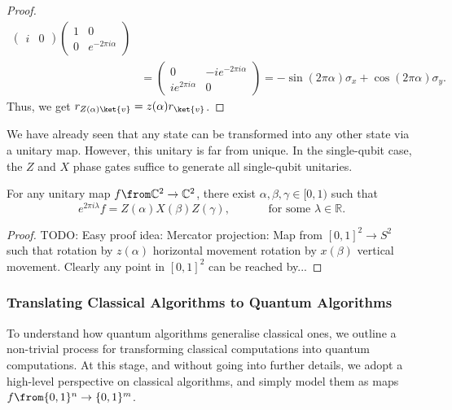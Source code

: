 \documentclass[a4paper,oneside, 12pt]{amsart}
\begin{document}
\begin{proof}
\begin{align*}
\begin{pmatrix}
        i & 0
      \end{pmatrix}
      \begin{pmatrix}
        1 & 0 \\
        0 & e^{-2\pi i \alpha}
      \end{pmatrix}\\
    & =
      \begin{pmatrix}
        0 & -ie^{-2\pi i \alpha} \\
        ie^{2\pi i \alpha} & 0
      \end{pmatrix}
      = -\sin(2\pi \alpha) \sigma_x + \cos(2\pi \alpha) \sigma_y.
  \end{align*}
  Thus, we get \(r_{Z(\alpha) \ket{v}} = z(\alpha)r_{\ket{v}}\).
\end{proof}

We have already seen that any state can be transformed into any other state via a unitary map.
However, this unitary is far from unique.
In the single-qubit case, the \( Z \) and \( X \) phase gates suffice to generate all single-qubit unitaries.

\begin{lemma}\label{lem:euler-decomposition-of-rotation}
  For any unitary map \( f \from \mathbb{C}^2 \to \mathbb{C}^2 \), there exist \( \alpha, \beta, \gamma \in [0,1) \) such that
  \begin{equation}
    e^{2\pi i \lambda} f = Z(\alpha) X(\beta) Z(\gamma) ,\qquad\quad \text{ for some } \lambda \in \mathbb{R}.
  \end{equation}
\end{lemma}
\begin{proof}
  TODO: Easy proof idea:
  Mercator projection:
  Map from \([0,1]^{2} \to S^{2}\) such that rotation by \(z(\alpha)\) horizontal movement
  rotation by \(x(\beta)\) vertical movement.
  Clearly any point in \([0,1]^{2}\) can be reached by...
\end{proof}

\subsubsection{Translating Classical Algorithms to Quantum Algorithms}\label{sec:translating-classical-algorithms-to-quantum-algorithms}
To understand how quantum algorithms generalise classical ones, we outline a non-trivial process for transforming classical computations into quantum computations.
At this stage, and without going into further details, we adopt a high-level perspective on classical algorithms, and simply model them as maps \(f \from \{0,1\}^n \to \{0,1\}^m\).
\end{document}
